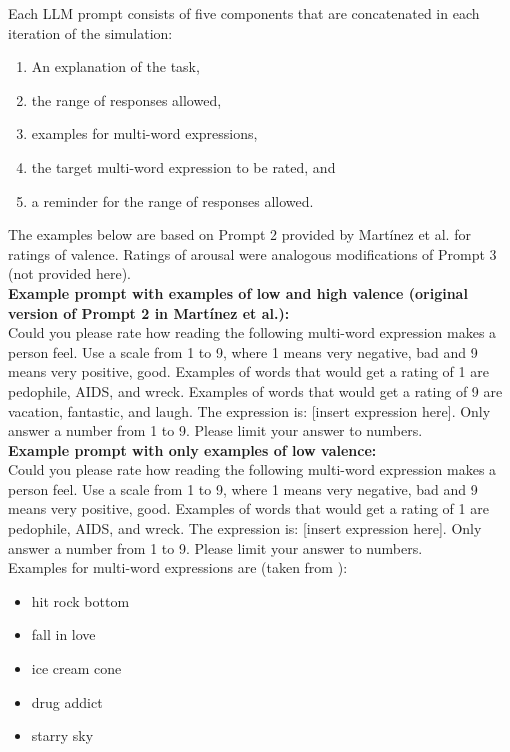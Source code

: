\documentclass[12pt]{article}
\begin{document}
	
	\begin{examplebox}
		Each LLM prompt consists of five components that are concatenated in each iteration of the simulation: 
		\begin{enumerate}
			\color{olive} \item An explanation of the task,
			\color{teal} \item the range of responses allowed, 
			\color{blue} \item examples for multi-word expressions, 
			\color{violet} \item the target multi-word expression to be rated, and
			\color{teal} \item a reminder for the range of responses allowed. 
		\end{enumerate}
		
		The examples below are based on Prompt 2 provided by Martínez et al. \parencite*{martinezUsingLargeLanguage2024} for ratings of valence. Ratings of arousal were analogous modifications of Prompt 3 (not provided here). \\
		
		\textbf{Example prompt with examples of low and high valence (original version of Prompt 2 in Martínez et al.): \\}
		\color{olive}Could you please rate how reading the following multi-word expression makes a person feel. \color{teal}Use a scale from 1 to 9, where 1 means very negative, bad and 9 means very positive, good. \color{blue}Examples of words that would get a rating of 1 are pedophile, AIDS, and wreck. Examples of words that would get a rating of 9 are vacation, fantastic, and laugh. \color{violet}The expression is: [insert expression here]. \color{teal} Only answer a number from 1 to 9. Please limit your answer to numbers. \\
		
		\color{black}\textbf{Example prompt with only examples of low valence: \\}
		\color{olive}Could you please rate how reading the following multi-word expression makes a person feel. \color{teal}Use a scale from 1 to 9, where 1 means very negative, bad and 9 means very positive, good. \color{blue}Examples of words that would get a rating of 1 are pedophile, AIDS, and wreck. \color{violet}The expression is: [insert expression here]. \color{teal}Only answer a number from 1 to 9. Please limit your answer to numbers. \\
		
		\color{black}Examples for multi-word expressions are (taken from \cite{martinezUsingLargeLanguage2024}):
		\begin{itemize}
			\item hit rock bottom
			\item fall in love
			\item ice cream cone
			\item drug addict
			\item starry sky
		\end{itemize}
	\end{examplebox}  
	
	
\end{document}

